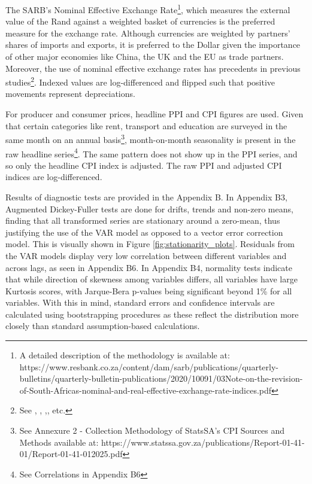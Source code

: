 \documentclass[12pt]{article}
\begin{document}
The SARB's Nominal Effective Exchange Rate\footnote{A detailed description of the methodology is available at: \\
https://www.resbank.co.za/content/dam/sarb/publications/quarterly-bulletins/quarterly-bulletin-publications/2020/10091/03Note-on-the-revision-of-South-Africas-nominal-and-real-effective-exchange-rate-indices.pdf}, which measures the external value of the Rand against a weighted basket of currencies is the preferred measure for the exchange rate. Although currencies are weighted by partners' shares of imports and exports, it is preferred to the Dollar given the importance of other major economies like China, the UK and the EU as trade partners.  Moreover, the use of nominal effective exchange rates has precedents in previous studies\footnote{See \textcite{mccarthy1999}, \textcite{Karoroetal2008},   \textcite{aronetal2012},\textcite{choudhri2015exchange}, \textcite{kabundi2016exchange} etc.}. Indexed values are log-differenced and flipped such that positive movements represent depreciations.

 For producer and consumer prices, headline PPI and CPI figures are used. Given that certain categories like rent, transport and education are surveyed in the same month on an annual basis\footnote{See Annexure 2 - Collection Methodology of StatsSA's CPI Sources and Methods available at: https://www.statssa.gov.za/publications/Report-01-41-01/Report-01-41-012025.pdf}, month-on-month seasonality is present in the raw headline series\footnote{See Correlations in Appendix B6}. The same pattern does not show up in the PPI series, and so only the headline CPI index is adjusted. The raw PPI and adjusted CPI indices are log-differenced. 

Results of diagnostic tests are provided in the Appendix B. In Appendix B3, Augmented Dickey-Fuller tests are done for drifts, trends and non-zero means, finding that all transformed series are stationary around a zero-mean, thus justifying the use of the VAR model as opposed to a vector error correction model. This is visually shown in Figure \ref{fig:stationarity_plots}. Residuals from the VAR models display very low correlation between different variables and across lags, as seen in Appendix B6. In Appendix B4, normality tests indicate that while direction of skewness among variables differs, all variables have large Kurtosis scores, with Jarque-Bera p-values being significant beyond 1\% for all variables. With this in mind, standard errors and confidence intervals are calculated using bootstrapping procedures as these reflect the distribution more closely than standard assumption-based calculations. 
\end{document}
